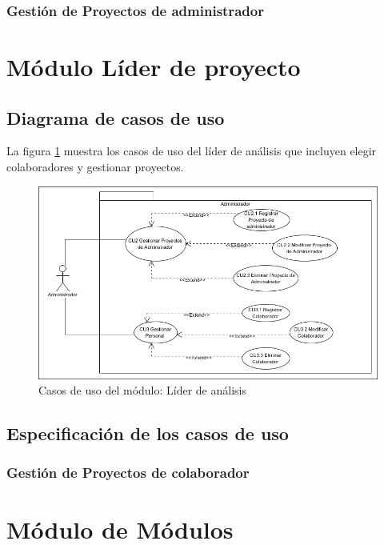 \subsubsection{Gestión de Proyectos de administrador}
	
	
\newpage	
\section{Módulo Líder de proyecto}
\subsection{Diagrama de casos de uso}

La figura \ref{fig:moduloLiderA} muestra los casos de uso del líder de análisis que incluyen elegir colaboradores y gestionar proyectos.

\begin{figure}[H]
	\begin{center}
		\includegraphics[angle=0,width=.8\textwidth]{images/Diagramas/moduloAdmin}
		\caption{Casos de uso del módulo: Líder de análisis}
		\label{fig:moduloLiderA}
	\end{center}
\end{figure}
\newpage

\subsection{Especificación de los casos de uso}
\subsubsection{Gestión de Proyectos de colaborador}


\newpage

\section{Módulo de Módulos}
